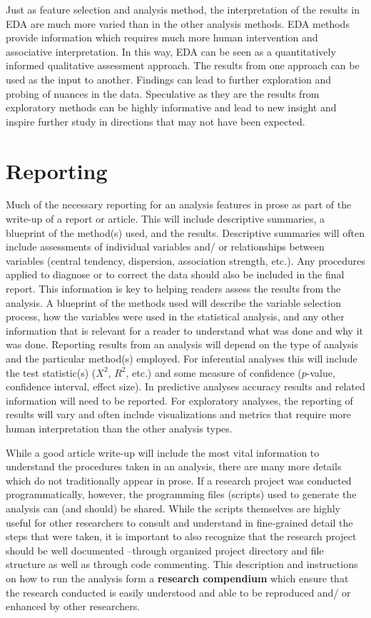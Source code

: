 \documentclass[
  letterpaper,
]{scrbook}
\begin{document}
Just as feature selection and analysis method, the interpretation of the
results in EDA are much more varied than in the other analysis methods.
EDA methods provide information which requires much more human
intervention and associative interpretation. In this way, EDA can be
seen as a quantitatively informed qualitative assessment approach. The
results from one approach can be used as the input to another. Findings
can lead to further exploration and probing of nuances in the data.
Speculative as they are the results from exploratory methods can be
highly informative and lead to new insight and inspire further study in
directions that may not have been expected.

\hypertarget{reporting}{%
\section{Reporting}\label{reporting}}

Much of the necessary reporting for an analysis features in prose as
part of the write-up of a report or article. This will include
descriptive summaries, a blueprint of the method(s) used, and the
results. Descriptive summaries will often include assessments of
individual variables and/ or relationships between variables (central
tendency, dispersion, association strength, etc.). Any procedures
applied to diagnose or to correct the data should also be included in
the final report. This information is key to helping readers assess the
results from the analysis. A blueprint of the methods used will describe
the variable selection process, how the variables were used in the
statistical analysis, and any other information that is relevant for a
reader to understand what was done and why it was done. Reporting
results from an analysis will depend on the type of analysis and the
particular method(s) employed. For inferential analyses this will
include the test statistic(s) (\(X^2\), \(R^2\), etc.) and some measure
of confidence (\(p\)-value, confidence interval, effect size). In
predictive analyses accuracy results and related information will need
to be reported. For exploratory analyses, the reporting of results will
vary and often include visualizations and metrics that require more
human interpretation than the other analysis types.

While a good article write-up will include the most vital information to
understand the procedures taken in an analysis, there are many more
details which do not traditionally appear in prose. If a research
project was conducted programmatically, however, the programming files
(scripts) used to generate the analysis can (and should) be shared.
While the scripts themselves are highly useful for other researchers to
consult and understand in fine-grained detail the steps that were taken,
it is important to also recognize that the research project should be
well documented --through organized project directory and file structure
as well as through code commenting. This description and instructions on
how to run the analysis form a \textbf{research compendium} which ensure
that the research conducted is easily understood and able to be
reproduced and/ or enhanced by other researchers.
\end{document}
